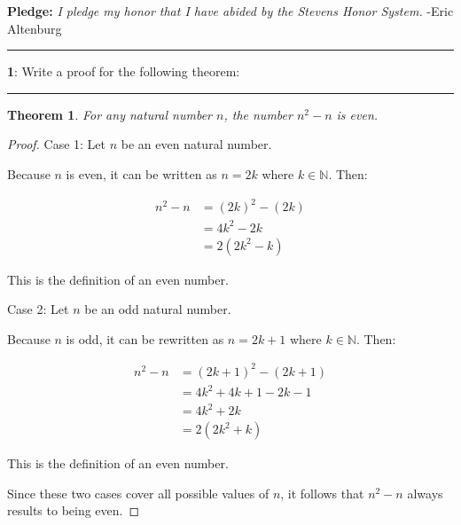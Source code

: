 \documentclass[11pt]{article}
\newtheorem{theorem}{Theorem}
\newcommand\question[2]{\vspace{.25in}\hrule\textbf{#1}: #2\vspace{.5em}\hrule\vspace{.10in}}
\newcommand{\N}{\mathbb{N}}
\begin{document}
\raggedright
\newcommand\NAME{Eric Altenburg}  %
\newcommand\COURSE{MA-240}
\newcommand\HWNUM{1 (Corrections)}              %


\textbf{Pledge:} \textit{I pledge my honor that I have abided by the Stevens Honor System.} -Eric Altenburg

\question{1}{Write a proof for the following theorem:}

\begin{theorem}
	For any natural number $n$, the number $n^2-n$ is even.
\end{theorem}

\begin{proof}
	Case 1: Let $n$ be an even natural number.

	Because $n$ is even, it can be written as $n=2k$ where $k \in \N$. Then:

	\begin{align*}
		n^2-n &= (2k)^2-(2k)\\
		&= 4k^2-2k\\
		&= 2(2k^2-k)
	\end{align*}

	This is the definition of an even number.

	Case 2: Let $n$ be an odd natural number.

	Because $n$ is odd, it can be rewritten as $n=2k+1$ where $k \in \N$. Then:

	\begin{align*}
		n^2-n &= (2k+1)^2 - (2k+1)\\
		&= 4k^2 + 4k + 1 - 2k -1\\
		&= 4k^2 + 2k\\
		&= 2(2k^2+k)
	\end{align*}

	This is the definition of an even number.

	Since these two cases cover all possible values of $n$, it follows that $n^2-n$ always results to being even.
\end{proof}


	
\end{document}
